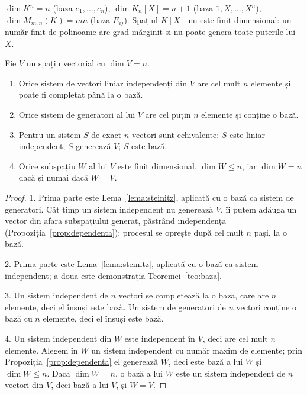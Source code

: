 \begin{exemplu}
$\dim K^n=n$ (baza $e_1,\dots,e_n$), $\dim K_n[X]=n+1$ (baza $1,X,\dots,X^n$), $\dim M_{m,n}(K)=mn$ (baza $E_{ij}$). Spațiul $K[X]$ nu este finit dimensional: un număr finit de polinoame are grad mărginit și nu poate genera toate puterile lui $X$.
\end{exemplu}

\begin{teorema}\label{teo:dimensiune}
Fie $V$ un spațiu vectorial cu $\dim V=n$.
\begin{enumerate}
\item Orice sistem de vectori liniar independenți din $V$ are cel mult $n$ elemente și poate fi completat până la o bază.
\item Orice sistem de generatori al lui $V$ are cel puțin $n$ elemente și conține o bază.
\item Pentru un sistem $S$ de exact $n$ vectori sunt echivalente: $S$ este liniar independent; $S$ generează $V$; $S$ este bază.
\item Orice subspațiu $W$ al lui $V$ este finit dimensional, $\dim W\le n$, iar $\dim W=n$ dacă și numai dacă $W=V$.
\end{enumerate}
\end{teorema}

\begin{proof}
1. Prima parte este Lema~\ref{lema:steinitz}, aplicată cu o bază ca sistem de generatori. Cât timp un sistem independent nu generează $V$, îi putem adăuga un vector din afara subspațiului generat, păstrând independența (Propoziția~\ref{prop:dependenta}); procesul se oprește după cel mult $n$ pași, la o bază.

2. Prima parte este Lema~\ref{lema:steinitz}, aplicată cu o bază ca sistem independent; a doua este demonstrația Teoremei~\ref{teo:baza}.

3. Un sistem independent de $n$ vectori se completează la o bază, care are $n$ elemente, deci el însuși este bază. Un sistem de generatori de $n$ vectori conține o bază cu $n$ elemente, deci el însuși este bază.

4. Un sistem independent din $W$ este independent în $V$, deci are cel mult $n$ elemente. Alegem în $W$ un sistem independent cu număr maxim de elemente; prin Propoziția~\ref{prop:dependenta} el generează $W$, deci este bază a lui $W$ și $\dim W\le n$. Dacă $\dim W=n$, o bază a lui $W$ este un sistem independent de $n$ vectori din $V$, deci bază a lui $V$, și $W=V$.
\end{proof}

